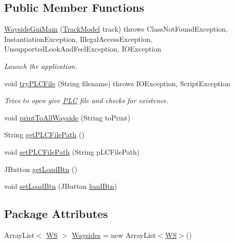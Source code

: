 \subsection*{Public Member Functions}
\begin{DoxyCompactItemize}
\item 
\hyperlink{classWaysideController_1_1WaysideGuiMain_af5c9eea089aa061d0f027ccd27a458db}{Wayside\+Gui\+Main} (\hyperlink{classTrackModel_1_1TrackModel}{Track\+Model} track)  throws Class\+Not\+Found\+Exception, Instantiation\+Exception, Illegal\+Access\+Exception, Unsupported\+Look\+And\+Feel\+Exception, I\+O\+Exception 
\begin{DoxyCompactList}\small\item\em Launch the application. \end{DoxyCompactList}\item 
void \hyperlink{classWaysideController_1_1WaysideGuiMain_a5f4353da24b4d0f25ba614c69f8d37bd}{try\+P\+L\+C\+File} (String filename)  throws I\+O\+Exception, Script\+Exception
\begin{DoxyCompactList}\small\item\em Tries to open give \hyperlink{classWaysideController_1_1PLC}{P\+LC} file and checks for existence. \end{DoxyCompactList}\item 
void \hyperlink{classWaysideController_1_1WaysideGuiMain_aa1fb5c7338ec4b6840f45af2bc507712}{print\+To\+All\+Wayside} (String to\+Print)
\item 
String \hyperlink{classWaysideController_1_1WaysideGuiMain_aab8b7369a64aa177fabe7bbe4e1208ca}{get\+P\+L\+C\+File\+Path} ()
\item 
void \hyperlink{classWaysideController_1_1WaysideGuiMain_a15eb954941c4b70ea6a4b842a73781bf}{set\+P\+L\+C\+File\+Path} (String p\+L\+C\+File\+Path)
\item 
J\+Button \hyperlink{classWaysideController_1_1WaysideGuiMain_abdc61ffc03ce5e58bfa37142c1935677}{get\+Load\+Btn} ()
\item 
void \hyperlink{classWaysideController_1_1WaysideGuiMain_a46c43048836307c70180dfd30fceea79}{set\+Load\+Btn} (J\+Button \hyperlink{classWaysideController_1_1WaysideGuiMain_a6024b79350afc61454bea1574e16701d}{load\+Btn})
\end{DoxyCompactItemize}
\subsection*{Package Attributes}
\begin{DoxyCompactItemize}
\item 
Array\+List$<$ \hyperlink{classWaysideController_1_1WS}{WS} $>$ \hyperlink{classWaysideController_1_1WaysideGuiMain_afaf467ad6f10a2ad0601b35302aa684f}{Waysides} = new Array\+List$<$\hyperlink{classWaysideController_1_1WS}{WS}$>$()
\end{DoxyCompactItemize}
